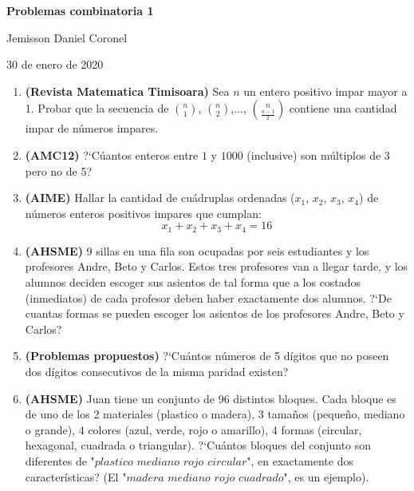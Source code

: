 \documentclass[10pt,a4 paper]{article}
\begin{document}
\chead{}

\begin{center}
\textbf{\Large{Problemas combinatoria 1}}
\end{center}

\begin{center}
Jemisson Daniel Coronel
\end{center}

\begin{center}
30 de enero de 2020
\end{center}
\vspace{9mm}
\begin{enumerate}

\item \textbf{(Revista Matematica Timisoara)} Sea $n$ un entero positivo impar mayor a 1. Probar que la secuencia de $\binom{n}{1}$, $\binom{n}{2}$,..., $\binom{n}{\frac{n - 1}{2}}$ contiene una cantidad impar de n\'umeros impares.

\item \textbf{(AMC12)} ?`C\'uantos enteros entre $1$ y $1000$ (inclusive) son m\'ultiplos de 3 pero no de 5?

\item \textbf{(AIME)} Hallar la cantidad de cu\'adruplas ordenadas ($x_{1}$, $x_{2}$, $x_{3}$, $x_{4}$) de n\'umeros enteros positivos impares que cumplan:
$$x_{1}+x_{2}+x_{3}+x_{4} = 16$$

\item \textbf{(AHSME)} 9 sillas en una fila son ocupadas por seis estudiantes y los profesores Andre, Beto y Carlos. Estos tres profesores van a llegar tarde, y los alumnos deciden escoger sus asientos de tal forma que a los costados (inmediatos) de cada profesor deben haber exactamente dos alumnos. ?`De cuantas formas se pueden escoger los asientos de los profesores Andre, Beto y Carlos?

\item \textbf{(Problemas propuestos)} ?`Cu\'antos n\'umeros de 5 d\'igitos que no poseen dos d\'igitos consecutivos de la misma paridad existen?  

\item \textbf{(AHSME)} Juan tiene un conjunto de 96 distintos bloques. Cada bloque es de uno de los 2 materiales (plastico o madera), 3 tama\~nos (peque\~no, mediano o grande), 4 colores (azul, verde, rojo o amarillo), 4 formas (circular, hexagonal, cuadrada o  triangular). ?`Cu\'antos bloques del conjunto son diferentes de "$plastico$ $mediano$ $rojo$ $circular$", en exactamente dos caracter\'isticas? (El "$madera$ $mediano$ $rojo$ $cuadrado$", es un ejemplo).


\end{enumerate}
\end{document}

